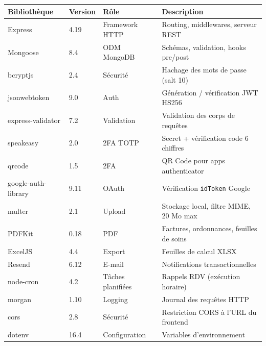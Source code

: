 \documentclass[12pt,a4paper]{report}
\begin{document}
\begin{center}
\small
\begin{tabular}{@{} l l l p{5.5cm} @{}}
  \toprule
  \textbf{Bibliothèque}   & \textbf{Version} & \textbf{Rôle}         & \textbf{Description} \\
  \midrule
  Express                 & 4.19  & Framework HTTP     & Routing, middlewares, serveur REST \\
  Mongoose                & 8.4   & ODM MongoDB        & Schémas, validation, hooks pre/post \\
  bcryptjs                & 2.4   & Sécurité           & Hachage des mots de passe (salt 10) \\
  jsonwebtoken            & 9.0   & Auth               & Génération / vérification JWT HS256 \\
  express-validator       & 7.2   & Validation         & Validation des corps de requêtes \\
  speakeasy               & 2.0   & 2FA TOTP           & Secret + vérification code 6 chiffres \\
  qrcode                  & 1.5   & 2FA                & QR Code pour apps authenticator \\
  google-auth-library     & 9.11  & OAuth              & Vérification \texttt{idToken} Google \\
  multer                  & 2.1   & Upload             & Stockage local, filtre MIME, 20 Mo max \\
  PDFKit                  & 0.18  & PDF                & Factures, ordonnances, feuilles de soins \\
  ExcelJS                 & 4.4   & Export             & Feuilles de calcul XLSX \\
  Resend                  & 6.12  & E-mail             & Notifications transactionnelles \\
  node-cron               & 4.2   & Tâches planifiées  & Rappels RDV (exécution horaire) \\
  morgan                  & 1.10  & Logging            & Journal des requêtes HTTP \\
  cors                    & 2.8   & Sécurité           & Restriction CORS à l'URL du frontend \\
  dotenv                  & 16.4  & Configuration      & Variables d'environnement \\
  \bottomrule
\end{tabular}
\end{center}
\end{document}
